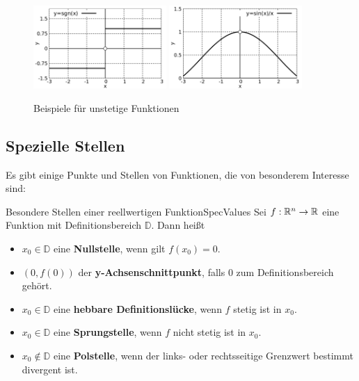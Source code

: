 \begin{figure}
    \centering
    \includegraphics[width=0.45\textwidth]{./gnuplot/example-non-continous-function-1}
    \includegraphics[width=0.45\textwidth]{./gnuplot/example-non-continous-function-2}
    \caption{Beispiele für unstetige Funktionen}
    \label{fig:NonContFun}
\end{figure}

\subsection{Spezielle Stellen}

Es gibt einige Punkte und Stellen von Funktionen, die von besonderem Interesse sind:

\begin{definition}{Besondere Stellen einer reellwertigen Funktion}{SpecValues}
    Sei $f: \mathbb{R}^n\to\mathbb{R}$ eine Funktion mit Definitionsbereich $\mathbb{D}$. Dann heißt
    \begin{itemize}
        \item $x_0\in\mathbb{D}$ eine \textbf{Nullstelle}, wenn gilt $f(x_0) = 0$.
        \item $(0, f(0))$ der \textbf{y-Achsenschnittpunkt}, falls $0$ zum Definitionsbereich gehört.
        \item $x_0 \in\mathbb{D}$ eine \textbf{hebbare Definitionslücke}, wenn $f$ stetig ist in $x_0$.
        \item $x_0 \in\mathbb{D}$ eine \textbf{Sprungstelle}, wenn $f$ nicht stetig ist in $x_0$.
        \item $x_0 \notin \mathbb{D}$ eine \textbf{Polstelle}, wenn der links- oder rechtsseitige Grenzwert bestimmt divergent ist.
    \end{itemize}
\end{definition}

